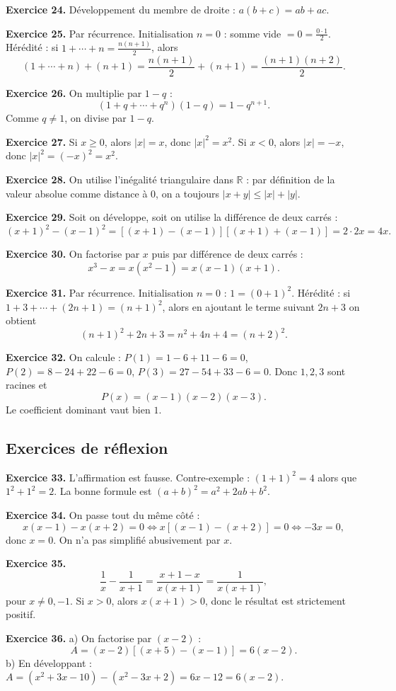 \documentclass[11pt,a4paper]{article}
\newcommand{\R}{\mathbb R}
\begin{document}
\textbf{Exercice 24.} Développement du membre de droite : $a(b+c)=ab+ac$.

\textbf{Exercice 25.} Par récurrence. Initialisation $n=0$ : somme vide $=0=\frac{0\cdot1}{2}$. Hérédité : si $1+\cdots+n=\frac{n(n+1)}2$, alors
\[(1+\cdots+n)+(n+1)=\frac{n(n+1)}2+(n+1)=\frac{(n+1)(n+2)}2.\]

\textbf{Exercice 26.} On multiplie par $1-q$ :
\[(1+q+\cdots+q^n)(1-q)=1-q^{n+1}.\]
Comme $q\neq 1$, on divise par $1-q$.

\textbf{Exercice 27.} Si $x\ge 0$, alors $|x|=x$, donc $|x|^2=x^2$. Si $x<0$, alors $|x|=-x$, donc $|x|^2=(-x)^2=x^2$.

\textbf{Exercice 28.} On utilise l'inégalité triangulaire dans $\R$ : par définition de la valeur absolue comme distance à $0$, on a toujours $|x+y|\le |x|+|y|$.

\textbf{Exercice 29.} Soit on développe, soit on utilise la différence de deux carrés :
\[(x+1)^2-(x-1)^2=[(x+1)-(x-1)] [(x+1)+(x-1)] =2\cdot 2x=4x.\]

\textbf{Exercice 30.} On factorise par $x$ puis par différence de deux carrés :
\[x^3-x=x(x^2-1)=x(x-1)(x+1).\]

\textbf{Exercice 31.} Par récurrence. Initialisation $n=0$ : $1=(0+1)^2$. Hérédité : si $1+3+\cdots +(2n+1)=(n+1)^2$, alors en ajoutant le terme suivant $2n+3$ on obtient
\[(n+1)^2+2n+3=n^2+4n+4=(n+2)^2.\]

\textbf{Exercice 32.} On calcule : $P(1)=1-6+11-6=0$, $P(2)=8-24+22-6=0$, $P(3)=27-54+33-6=0$. Donc $1,2,3$ sont racines et
\[P(x)=(x-1)(x-2)(x-3).\]
Le coefficient dominant vaut bien $1$.

\subsection*{Exercices de réflexion}
\textbf{Exercice 33.} L'affirmation est fausse. Contre-exemple : $(1+1)^2=4$ alors que $1^2+1^2=2$. La bonne formule est $(a+b)^2=a^2+2ab+b^2$.

\textbf{Exercice 34.} On passe tout du même côté :
\[x(x-1)-x(x+2)=0 \iff x[(x-1)-(x+2)]=0 \iff -3x=0,\]
donc $x=0$. On n'a pas simplifié abusivement par $x$.

\textbf{Exercice 35.} 
\[\frac1x-\frac1{x+1}=\frac{x+1-x}{x(x+1)}=\frac1{x(x+1)},\]
pour $x\neq 0,-1$. Si $x>0$, alors $x(x+1)>0$, donc le résultat est strictement positif.

\textbf{Exercice 36.} a) On factorise par $(x-2)$ :
\[A=(x-2)[(x+5)-(x-1)]=6(x-2).\]
 b) En développant : $A=(x^2+3x-10)-(x^2-3x+2)=6x-12=6(x-2)$.
\end{document}
